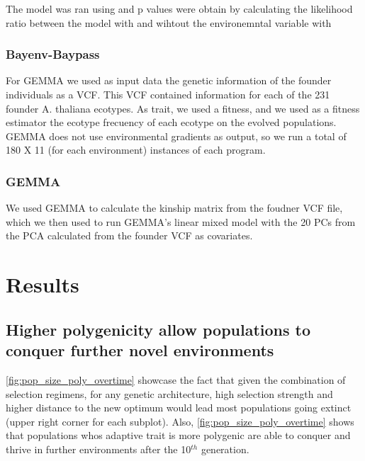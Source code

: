 \documentclass{article}
\begin{document}
The model was ran using \citep{Bates2015-rh} and p values were obtain by calculating the likelihood ratio between the model with and wihtout the environemntal variable with \citep{Kuznetsova2017-ki}

\subsubsection{Bayenv-Baypass}

For GEMMA %
we used as input data the genetic information of the founder individuals as a VCF. This VCF contained information for each of the 231 founder A. thaliana ecotypes. As trait, we used a fitness, and we used as a fitness estimator the ecotype frecuency of each ecotype on the evolved populations. 
GEMMA %
does not use environmental gradients as output, so we run a total of 180 X 11 (for each environment) instances of each program. 

\subsubsection{GEMMA}
We used GEMMA to calculate the kinship matrix from the foudner VCF file, which we then used to run GEMMA's linear mixed model with the 20 PCs from the PCA calculated from the founder VCF as covariates. 


\section{Results}

\subsection{Higher polygenicity allow populations to conquer further novel environments}
 \ref{fig:pop_size_poly_overtime} showcase the fact that given the combination of selection regimens, for any genetic architecture, high selection strength and higher distance to the new optimum would lead most populations going extinct (upper right corner for each subplot).
Also, \ref{fig:pop_size_poly_overtime} shows that populations whos adaptive trait is more polygenic are able to conquer  and thrive in further environments after the 10$^{th}$ generation. 
\end{document}
